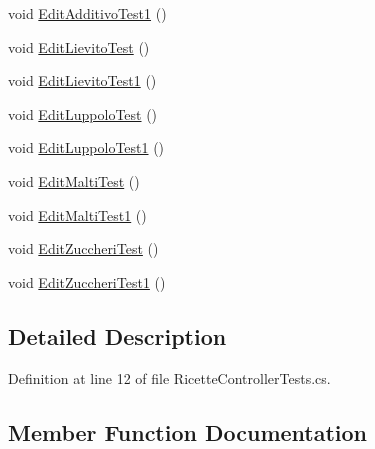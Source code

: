 \begin{DoxyCompactItemize}
void \mbox{\hyperlink{class_brew_day2_1_1_controllers_1_1_tests_1_1_ricette_controller_tests_a768dd70bc88d8ac92949044c2acee0c2}{Edit\+Additivo\+Test1}} ()
\item 
void \mbox{\hyperlink{class_brew_day2_1_1_controllers_1_1_tests_1_1_ricette_controller_tests_ae6d377c433d4e215413e863ebede70bc}{Edit\+Lievito\+Test}} ()
\item 
void \mbox{\hyperlink{class_brew_day2_1_1_controllers_1_1_tests_1_1_ricette_controller_tests_ab0be599bca8482a874c667a5225c4a35}{Edit\+Lievito\+Test1}} ()
\item 
void \mbox{\hyperlink{class_brew_day2_1_1_controllers_1_1_tests_1_1_ricette_controller_tests_a6f743b3335520481f9378201ce2bda44}{Edit\+Luppolo\+Test}} ()
\item 
void \mbox{\hyperlink{class_brew_day2_1_1_controllers_1_1_tests_1_1_ricette_controller_tests_aa29f08dcc6b6706843c0954df4076c6a}{Edit\+Luppolo\+Test1}} ()
\item 
void \mbox{\hyperlink{class_brew_day2_1_1_controllers_1_1_tests_1_1_ricette_controller_tests_ac5813654ea4136f14400f645bcf9629a}{Edit\+Malti\+Test}} ()
\item 
void \mbox{\hyperlink{class_brew_day2_1_1_controllers_1_1_tests_1_1_ricette_controller_tests_a8b1fe4c5dae738c564c612e0a7fe19a1}{Edit\+Malti\+Test1}} ()
\item 
void \mbox{\hyperlink{class_brew_day2_1_1_controllers_1_1_tests_1_1_ricette_controller_tests_a69163841cabf755b497afc5e1bd56672}{Edit\+Zuccheri\+Test}} ()
\item 
void \mbox{\hyperlink{class_brew_day2_1_1_controllers_1_1_tests_1_1_ricette_controller_tests_a4efc0428918dcbe9695569fa4a7f5523}{Edit\+Zuccheri\+Test1}} ()
\end{DoxyCompactItemize}


\subsection{Detailed Description}


Definition at line 12 of file Ricette\+Controller\+Tests.\+cs.



\subsection{Member Function Documentation}
\mbox{\label{class_brew_day2_1_1_controllers_1_1_tests_1_1_ricette_controller_tests_a14aebcad2b91832ef629096395b4c7e8}} 
